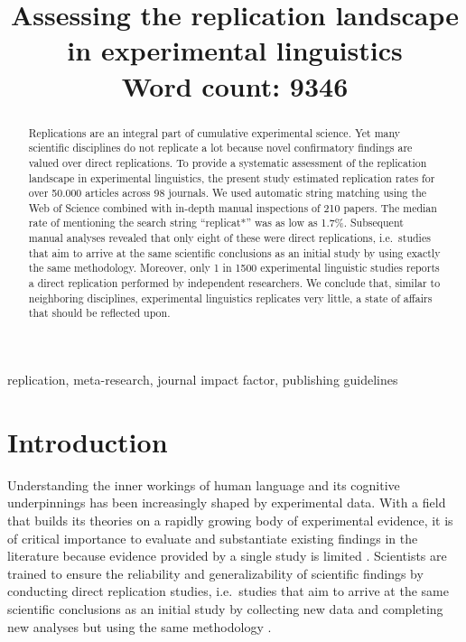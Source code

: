 \documentclass[cm,linguex]{glossa}
\title[]{Assessing the replication landscape in experimental linguistics\\ \bigskip \large Word count: 9346}
\author[]{
  }
\begin{document}
\sffamily
\maketitle

\begin{abstract}
Replications are an integral part of cumulative experimental science. Yet many scientific disciplines do not replicate a lot because novel confirmatory findings are valued over direct replications. To provide a systematic assessment of the replication landscape in experimental linguistics, the present study estimated replication rates for over 50.000 articles across 98 journals. We used automatic string matching using the Web of Science combined with in-depth manual inspections of 210 papers. The median rate of mentioning the search string ``replicat*'' was as low as 1.7\%. Subsequent manual analyses revealed that only eight of these were direct replications, i.e.~studies that aim to arrive at the same scientific conclusions as an initial study by using exactly the same methodology. Moreover, only 1 in 1500 experimental linguistic studies reports a direct replication performed by independent researchers. We conclude that, similar to neighboring disciplines, experimental linguistics replicates very little, a state of affairs that should be reflected upon.
\end{abstract}

\begin{keywords}
  replication, meta-research, journal impact factor, publishing guidelines
\end{keywords}

\rmfamily

\hypertarget{introduction}{%
\section{Introduction}\label{introduction}}

Understanding the inner workings of human language and its cognitive underpinnings has been increasingly shaped by experimental data. With a field that builds its theories on a rapidly growing body of experimental evidence, it is of critical importance to evaluate and substantiate existing findings in the literature because evidence provided by a single study is limited \citep[e.g.,][]{amrhein2019inferential}. Scientists are trained to ensure the reliability and generalizability of scientific findings by conducting direct replication studies, i.e.~studies that aim to arrive at the same scientific conclusions as an initial study by collecting new data and completing new analyses but using the same methodology \citep[see][ for a comprehensive overview of different terminological uses]{barba_terminologies_2018}.
\end{document}
